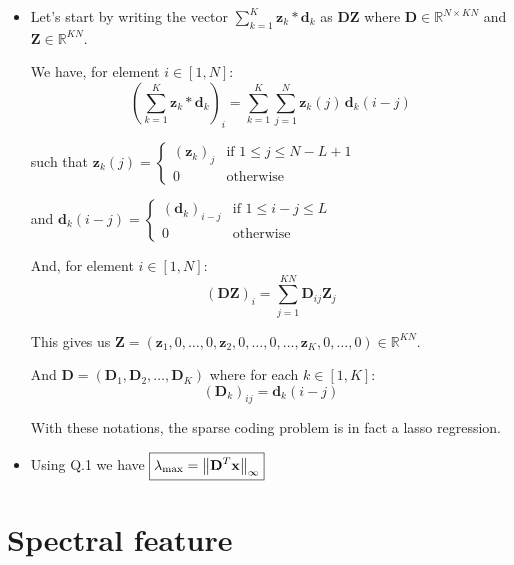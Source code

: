 \documentclass[11pt]{article}
\begin{document}
\begin{solution}  %

\begin{itemize}
    \item Let's start by writing the vector $\sum_{k=1}^{K} \mathbf{z}_k * \mathbf{d}_k$ as $\mathbf{D}\mathbf{Z}$ where $\mathbf{D} \in \mathbb{R}^{N \times KN}$ and $\mathbf{Z} \in \mathbb{R}^{KN}$.
    
    We have, for element $i \in [1,N]$:
    \[
    \left( \sum_{k=1}^{K} \mathbf{z}_k * \mathbf{d}_k \right)_i = \sum_{k=1}^{K} \sum_{j=1}^{N} \mathbf{z}_k(j) \, \mathbf{d}_k(i-j) \tag{$\star$}
    \]
    
    such that $\mathbf{z}_k(j) =
    \begin{cases}
    (\mathbf{z}_k)_j & \text{if } 1 \leq j \leq N-L+1 \\
    0 & \text{otherwise}
    \end{cases}$
    
    and $\mathbf{d}_k(i-j) =
    \begin{cases}
    (\mathbf{d}_k)_{i-j} & \text{if } 1 \leq i-j \leq L \\
    0 & \text{otherwise}
    \end{cases}$
    
    And, for element $i \in [1,N]$:
    \[
    \left(\mathbf{DZ} \right)_i = \sum_{j=1}^{KN} \mathbf{D}_{ij}\mathbf{Z}_j \tag{$\star$}
    \]
    
    This gives us $\mathbf{Z} = \left(\mathbf{z}_1, 0, \dots, 0, \mathbf{z}_2, 0, \dots, 0, \dots, \mathbf{z}_K, 0, \dots, 0\right) \in \mathbb{R}^{KN}.$
    
    And $\mathbf{D} = (\mathbf{D}_1, \mathbf{D}_2, \dots, \mathbf{D}_K)$ where for each $k \in [1,K]:$
    \[
    (\mathbf{D}_k)_{ij} = \mathbf{d}_k(i-j)
    \]
    
    With these notations, the sparse coding problem is in fact a lasso regression.

    \item Using Q.1 we have $\boxed{\lambda_{\max} = \left\lVert\mathbf{D}^T\mathbf{x}\right\rVert_\infty}$
    
\end{itemize}


\end{solution}

\section{Spectral feature}
\end{document}
